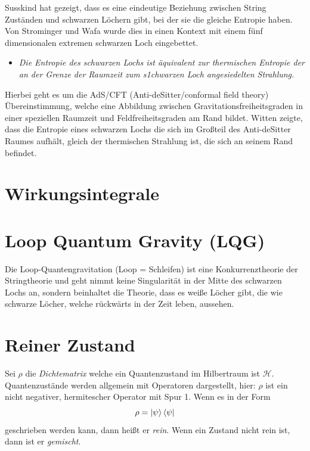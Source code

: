 \documentclass[ngerman]{scrartcl}
\newcommand{\Hil}{\mathcal{H}}
\begin{document}
	Susskind \cite{Susskind} hat gezeigt, dass es eine eindeutige Beziehung zwischen String Zuständen und schwarzen Löchern gibt, bei der sie die gleiche Entropie haben. Von Strominger und Wafa \cite{StromingerWafa} wurde dies in einen Kontext mit einem fünf dimensionalen extremen schwarzen Loch eingebettet. 
	
	\begin{itemize}
		\item [~] \textit{Die Entropie des schwarzen Lochs ist äquivalent zur thermischen Entropie der an der Grenze der Raumzeit zum s1chwarzen Loch angesiedelten Strahlung.}
	\end{itemize}
	Hierbei geht es um die AdS/CFT (Anti-deSitter/conformal field theory) Übereinstimmung, welche eine Abbildung zwischen Gravitationsfreiheitsgraden in einer speziellen Raumzeit und Feldfreiheitsgraden am Rand bildet. 
	Witten \cite{Witten} zeigte, dass die Entropie eines schwarzen Lochs die sich im Großteil des Anti-deSitter Raumes aufhält, gleich der thermischen Strahlung ist, die sich an seinem Rand befindet. 
	
\section{Wirkungsintegrale}

\section{Loop Quantum Gravity (LQG)}	
Die Loop-Quantengravitation (Loop = Schleifen) ist eine Konkurrenztheorie der Stringtheorie und geht nimmt keine Singularität in der Mitte des schwarzen Lochs an, sondern beinhaltet die Theorie, dass es weiße Löcher gibt, die wie schwarze Löcher, welche rückwärts in der Zeit leben, aussehen. 

\appendix
\section{Reiner Zustand} \label{ReinerZustandA}
Sei $\rho$ die \textit{Dichtematrix} welche ein Quantenzustand im Hilbertraum ist $\Hil$. Quantenzustände werden allgemein mit Operatoren dargestellt, hier: $\rho$ ist ein nicht negativer, hermitescher Operator mit Spur 1. Wenn es in der Form
	\begin{equation}
		\rho=\ket{\psi} \bra{\psi}
	\end{equation}
geschrieben werden kann, dann heißt er \textit{rein}. Wenn ein Zustand nicht rein ist, dann ist er \textit{gemischt}.
\end{document}
